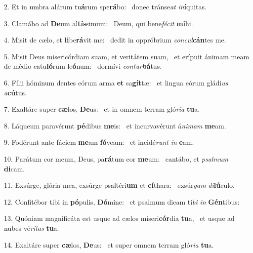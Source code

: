2. Et in umbra alárum tu\textbf{á}rum spe\textbf{rá}bo: \ast\  donec tránse\textit{at} \textit{in}\textbf{í}quitas.\

3. Clamábo ad \textbf{De}um al\textbf{tís}simum: \ast\  Deum, qui bene\textit{fé}\textit{cit} \textbf{mi}hi.\

4. Misit de cælo, et \textbf{li}be\textbf{rá}vit me: \ast\  dedit in oppróbrium \textit{con}\textit{cul}\textbf{cán}tes me.\

5. Misit Deus misericórdiam suam, et veritátem suam, \dag\  et erípuit ánimam meam de médio catu\textbf{ló}rum le\textbf{ó}num: \ast\  dormívi \textit{con}\textit{tur}\textbf{bá}tus.\

6. Fílii hóminum dentes eórum arma \textbf{et} sa\textbf{gít}tæ: \ast\  et lingua eórum gládi\textit{us} \textit{a}\textbf{cú}tus.\

7. Exaltáre super \textbf{cæ}los, \textbf{De}us: \ast\  et in omnem terram gló\textit{ri}\textit{a} \textbf{tu}a.\

8. Láqueum paravérunt \textbf{pé}dibus \textbf{me}is: \ast\  et incurvavérunt á\textit{ni}\textit{mam} \textbf{me}am.\

9. Fodérunt ante fáciem \textbf{me}am \textbf{fó}veam: \ast\  et incidé\textit{runt} \textit{in} \textbf{e}am.\

10. Parátum cor meum, Deus, pa\textbf{rá}tum cor \textbf{me}um: \ast\  cantábo, et \textit{psal}\textit{mum} \textbf{di}cam.\

11. Exsúrge, glória mea, exsúrge psaltéri\textbf{um} et \textbf{cí}thara: \ast\  exsúr\textit{gam} \textit{di}\textbf{lú}culo.\

12. Confitébor tibi in \textbf{pó}pulis, \textbf{Dó}mine: \ast\  et psalmum dicam ti\textit{bi} \textit{in} \textbf{Gén}tibus:\

13. Quóniam magnificáta est usque ad cælos miseri\textbf{cór}dia \textbf{tu}a, \ast\  et usque ad nubes vé\textit{ri}\textit{tas} \textbf{tu}a.\

14. Exaltáre super \textbf{cæ}los, \textbf{De}us: \ast\  et super omnem terram gló\textit{ri}\textit{a} \textbf{tu}a.\

